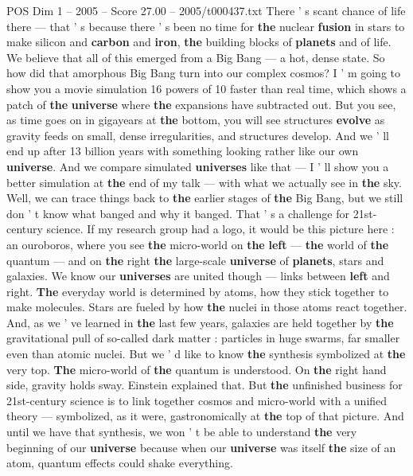 \begin{textsample}{POS Dim 1 – 2005 – Score 27.00 – 2005/t000437.txt}
There ' s scant chance of life there — that ' s because there ' s been no time for \textbf{the} nuclear \textbf{fusion} in stars to make silicon and \textbf{carbon} and \textbf{iron}, \textbf{the} building blocks of \textbf{planets} and of life.
We believe that all of this emerged from a Big Bang — a hot, dense state.
So how did that amorphous Big Bang turn into our complex cosmos?
I ' m going to show you a movie simulation 16 powers of 10 faster than real time, which shows a patch of \textbf{the} \textbf{universe} where \textbf{the} expansions have subtracted out.
But you see, as time goes on in gigayears at \textbf{the} bottom, you will see structures \textbf{evolve} as gravity feeds on small, dense irregularities, and structures develop.
And we ' ll end up after 13 billion years with something looking rather like our own \textbf{universe}.
And we compare simulated \textbf{universes} like that — I ' ll show you a better simulation at \textbf{the} end of my talk — with what we actually see in \textbf{the} sky.
Well, we can trace things back to \textbf{the} earlier stages of \textbf{the} Big Bang, but we still don ' t know what banged and why it banged.
That ' s a challenge for 21st-century science.
If my research group had a logo, it would be this picture here : an ouroboros, where you see \textbf{the} micro-world on \textbf{the} \textbf{left} — \textbf{the} world of \textbf{the} quantum — and on \textbf{the} right \textbf{the} large-scale \textbf{universe} of \textbf{planets}, stars and galaxies.
We know our \textbf{universes} are united though — links between \textbf{left} and right. \textbf{The} everyday world is determined by atoms, how they stick together to make molecules.
Stars are fueled by how \textbf{the} nuclei in those atoms react together.
And, as we ' ve learned in \textbf{the} last few years, galaxies are held together by \textbf{the} gravitational pull of so-called dark matter : particles in huge swarms, far smaller even than atomic nuclei.
But we ' d like to know \textbf{the} synthesis symbolized at \textbf{the} very top. \textbf{The} micro-world of \textbf{the} quantum is understood.
On \textbf{the} right hand side, gravity holds sway.
Einstein explained that.
But \textbf{the} unfinished business for 21st-century science is to link together cosmos and micro-world with a unified theory — symbolized, as it were, gastronomically at \textbf{the} top of that picture.
And until we have that synthesis, we won ' t be able to understand \textbf{the} very beginning of our \textbf{universe} because when our \textbf{universe} was itself \textbf{the} size of an atom, quantum effects could shake everything.

\end{textsample}
